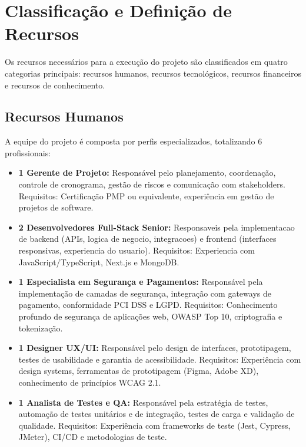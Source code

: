 \section{Classificação e Definição de Recursos}

Os recursos necessários para a execução do projeto são classificados em quatro categorias principais: recursos humanos, recursos tecnológicos, recursos financeiros e recursos de conhecimento.

\subsection{Recursos Humanos}

A equipe do projeto é composta por perfis especializados, totalizando 6 profissionais:

\begin{itemize}
    \item \textbf{1 Gerente de Projeto:} Responsável pelo planejamento, coordenação, controle de cronograma, gestão de riscos e comunicação com stakeholders. Requisitos: Certificação PMP ou equivalente, experiência em gestão de projetos de software.

    \item \textbf{2 Desenvolvedores Full-Stack Senior:} Responsaveis pela implementacao de backend (APIs, logica de negocio, integracoes) e frontend (interfaces responsivas, experiencia do usuario). Requisitos: Experiencia com JavaScript/TypeScript, Next.js e MongoDB.

    \item \textbf{1 Especialista em Segurança e Pagamentos:} Responsável pela implementação de camadas de segurança, integração com gateways de pagamento, conformidade PCI DSS e LGPD. Requisitos: Conhecimento profundo de segurança de aplicações web, OWASP Top 10, criptografia e tokenização.

    \item \textbf{1 Designer UX/UI:} Responsável pelo design de interfaces, prototipagem, testes de usabilidade e garantia de acessibilidade. Requisitos: Experiência com design systems, ferramentas de prototipagem (Figma, Adobe XD), conhecimento de princípios WCAG 2.1.

    \item \textbf{1 Analista de Testes e QA:} Responsável pela estratégia de testes, automação de testes unitários e de integração, testes de carga e validação de qualidade. Requisitos: Experiência com frameworks de teste (Jest, Cypress, JMeter), CI/CD e metodologias de teste.
\end{itemize}

